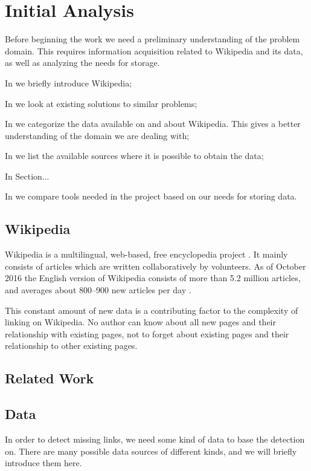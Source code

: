 \chapter{Initial Analysis}\label{chap:analysis}
Before beginning the work we need a preliminary understanding of the problem domain. This requires information acquisition related to Wikipedia and its data, as well as analyzing the needs for storage.

\begin{chapterorganization}
  \item In  we briefly introduce Wikipedia;
  \item In  we look at existing solutions to similar problems;
  \item In  we categorize the data available on and about Wikipedia. This gives a better understanding of the domain we are dealing with;
  \item In  we list the available sources where it is possible to obtain the data;
  \item In Section...
  \item In  we compare tools needed in the project based on our needs for storing data.
\end{chapterorganization}

\section{Wikipedia}\label{sec:about_wikipedia}
Wikipedia is a multilingual, web-based, free encyclopedia project \cite{wiki-about}. It mainly consists of articles which are written collaboratively by volunteers. As of October 2016 the English version of Wikipedia consists of more than 5.2 million articles, and averages about 800--900 new articles per day \cite{wmcharts}.

This constant amount of new data is a contributing factor to the complexity of linking on Wikipedia. No author can know about all new pages and their relationship with existing pages, not to forget about existing pages and their relationship to other existing pages.

\section{Related Work}\label{sec:related_work}
\dummy

\section{Data}\label{sec:data}
In order to detect missing links, we need some kind of data to base the detection on. There are many possible data sources of different kinds, and we will briefly introduce them here.

